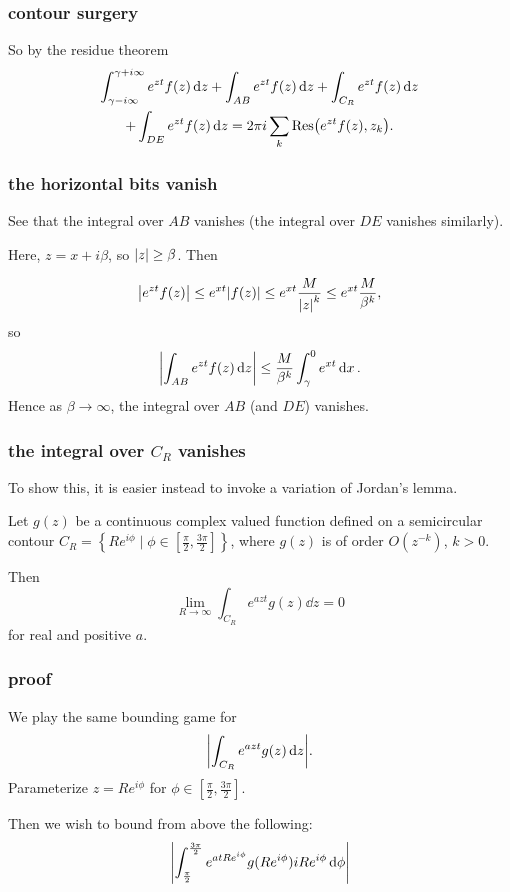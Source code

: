 \documentclass[mathserif]{beamer}
\newcommand{\sbr}[1]{\left[#1\right]}
\newcommand{\cbr}[1]{\left\{#1\right\}}
\begin{document}
\begin{frame}
  \frametitle{contour surgery}

  So by the residue theorem \begin{multline*}
    \int_{\gamma-i\infty}^{\gamma+i\infty} e^{zt}f(z)\dd{z} + \int_{AB} e^{zt}f(z)\dd{z} + \int_{C_R} e^{zt}f(z)\dd{z}\\ + \int_{DE} e^{zt}f(z)\dd{z} = 2\pi i\sum_k \Res(e^{zt}f(z), z_k).
  \end{multline*}

\end{frame}

\begin{frame}
  \frametitle{the horizontal bits vanish}

  See that the integral over $AB$ vanishes (the integral over $DE$ vanishes similarly).

  Here, $z=x+i\beta$, so $\abs{z}\geq\beta$. Then

  \[\abs{e^{zt}f(z)} \leq e^{xt}\abs{f(z)}\leq e^{xt}\frac{M}{\abs{z}^k} \leq e^{xt}\frac{M}{\beta^k},\] so \[\abs{\int_{AB} e^{zt}f(z)\dd{z}}\leq \frac{M}{\beta^k}\int_{\gamma}^0e^{xt}\dd{x}.\] Hence as $\beta\to\infty$, the integral over $AB$ (and $DE$) vanishes.

\end{frame}

\begin{frame}
  \frametitle{the integral over $C_R$ vanishes}

  To show this, it is easier instead to invoke a variation of Jordan's lemma.

  \begin{lemma}
    Let $g(z)$ be a continuous complex valued function defined on a semicircular contour $C_R = \cbr{Re^{i \phi}\mid \phi \in\sbr{\frac{\pi}{2},\frac{3\pi}{2}}}$, where $g(z)$ is of order $O(z^{-k})$, $k>0$.
    
    Then \[\lim_{R\to\infty}\int_{C_R}e^{azt}g(z)\dd{z} = 0\] for real and positive $a$.
  \end{lemma}


\end{frame}

\begin{frame}
  \frametitle{proof}

  We play the same bounding game for \[\abs{\int_{C_R}e^{azt}g(z)\dd{z}}.\] Parameterize $z = Re^{i\phi}$ for $\phi \in\sbr{\frac{\pi}{2},\frac{3\pi}{2}}$.

  Then we wish to bound from above the following: \[\abs{\int_{\frac{\pi}{2}}^{\frac{3\pi}{2}}e^{atRe^{i\phi}}g(Re^{i\phi})iRe^{i\phi}\dd{\phi}}\]

\end{frame}
\end{document}
